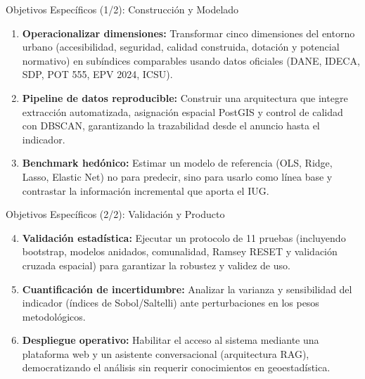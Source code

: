 \documentclass[aspectratio=169,11pt]{beamer}
\begin{document}
\begin{frame}{Objetivos Específicos (1/2): Construcción y Modelado}
  \begin{enumerate}
    \item \textbf{Operacionalizar dimensiones:} Transformar cinco dimensiones del entorno urbano (accesibilidad, seguridad, calidad construida, dotación y potencial normativo) en subíndices comparables usando datos oficiales (DANE, IDECA, SDP, POT 555, EPV 2024, ICSU).
    \item \textbf{Pipeline de datos reproducible:} Construir una arquitectura que integre extracción automatizada, asignación espacial PostGIS y control de calidad con DBSCAN, garantizando la trazabilidad desde el anuncio hasta el indicador.
    \item \textbf{Benchmark hedónico:} Estimar un modelo de referencia (OLS, Ridge, Lasso, Elastic Net) no para predecir, sino para usarlo como línea base y contrastar la información incremental que aporta el IUG.
  \end{enumerate}
\end{frame}

\begin{frame}{Objetivos Específicos (2/2): Validación y Producto}
  \begin{enumerate}
    \setcounter{enumi}{3} %
    \item \textbf{Validación estadística:} Ejecutar un protocolo de 11 pruebas (incluyendo bootstrap, modelos anidados, comunalidad, Ramsey RESET y validación cruzada espacial) para garantizar la robustez y validez de uso.
    \item \textbf{Cuantificación de incertidumbre:} Analizar la varianza y sensibilidad del indicador (índices de Sobol/Saltelli) ante perturbaciones en los pesos metodológicos.
    \item \textbf{Despliegue operativo:} Habilitar el acceso al sistema mediante una plataforma web y un asistente conversacional (arquitectura RAG), democratizando el análisis sin requerir conocimientos en geoestadística.
  \end{enumerate}
\end{frame}
\end{document}
